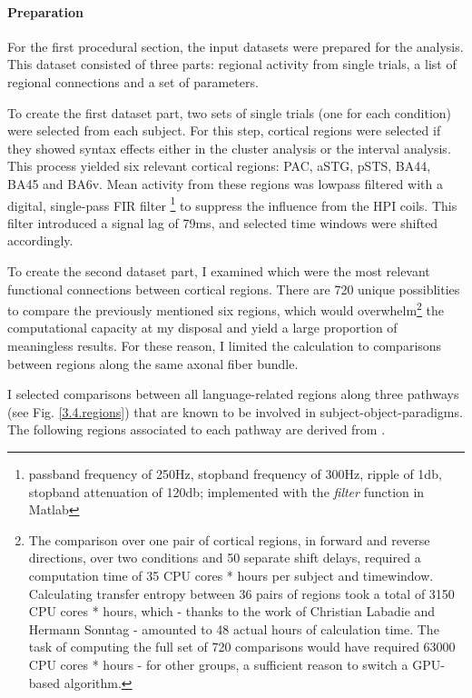 \paragraph{Preparation}
For the first procedural section, the input datasets were prepared for the analysis.
This dataset consisted of three parts: regional activity from single trials, a list of regional connections and a set of parameters.

To create the first dataset part, two sets of single trials (one for each condition) were selected from each subject.
For this step, cortical regions were selected if they showed syntax effects either in the cluster analysis or the interval analysis.
This process yielded six relevant cortical regions: PAC, aSTG, pSTS, BA44, BA45 and BA6v.
Mean activity from these regions was lowpass filtered with a digital, single-pass FIR filter \footnote{passband frequency of 250Hz, stopband frequency of 300Hz, ripple of 1db, stopband attenuation of 120db; implemented with the \emph{filter} function in Matlab} to suppress the influence from the HPI coils.
This filter introduced a signal lag of 79ms, and selected time windows were shifted accordingly.

To create the second dataset part, I examined which were the most relevant functional connections between cortical regions.
There are 720 unique possiblities to compare the previously mentioned six regions, which would overwhelm\footnote{The comparison over one pair of cortical regions, in forward and reverse directions, over two conditions and 50 separate shift delays, required a computation time of 35 CPU cores * hours per subject and timewindow. Calculating transfer entropy between 36 pairs of regions took a total of 3150 CPU cores * hours, which - thanks to the work of Christian Labadie and Hermann Sonntag - amounted to 48 actual hours of calculation time. The task of computing the full set of 720 comparisons would have required 63000 CPU cores * hours - for other groups, a sufficient reason to switch a GPU-based algorithm\cite{3.4.gpuTE}.} the computational capacity at my disposal and yield a large proportion of meaningless results.
For these reason, I limited the calculation to comparisons between regions along the same axonal fiber bundle.

I selected comparisons between all language-related regions along three pathways (see Fig. \ref{3.4.regions}) that are known to be involved in subject-object-paradigms.
The following regions associated to each pathway are derived from \cite{1.1.pathways}.

